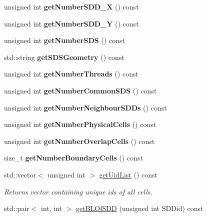\begin{DoxyCompactItemize}
unsigned int {\bfseries get\+Number\+S\+D\+D\+\_\+X} () const
\item 
\mbox{\label{classDomain_a8e8d6c959123597f6e2d8779a836d32c}} 
unsigned int {\bfseries get\+Number\+S\+D\+D\+\_\+Y} () const
\item 
\mbox{\label{classDomain_a25e60a79720035ab95a1eb4a41efb53c}} 
unsigned int {\bfseries get\+Number\+S\+DS} () const
\item 
\mbox{\label{classDomain_a388103cf2adcc7224f77d4c26a471d6a}} 
std\+::string {\bfseries get\+S\+D\+S\+Geometry} () const
\item 
\mbox{\label{classDomain_ac1e1ec57c7c0401dbee987d1c760ced7}} 
unsigned int {\bfseries get\+Number\+Threads} () const
\item 
\mbox{\label{classDomain_aed97d5cc3e6c7be237798b0903d2a6cf}} 
unsigned int {\bfseries get\+Number\+Common\+S\+DS} () const
\item 
\mbox{\label{classDomain_a985c94d1108a0a206f0201908d944a0d}} 
unsigned int {\bfseries get\+Number\+Neighbour\+S\+D\+Ds} () const
\item 
\mbox{\label{classDomain_a428011ce5e842c9f05545c57480ed30e}} 
unsigned int {\bfseries get\+Number\+Physical\+Cells} () const
\item 
\mbox{\label{classDomain_adbbd89acedd87b8b4814e367027551cd}} 
unsigned int {\bfseries get\+Number\+Overlap\+Cells} () const
\item 
\mbox{\label{classDomain_a8800b218283c35d315829dc9bac72c26}} 
size\+\_\+t {\bfseries get\+Number\+Boundary\+Cells} () const
\item 
std\+::vector$<$ unsigned int $>$ \mbox{\hyperlink{classDomain_a6f7d5f16ca53367feabc00b9efa05be8}{get\+Uid\+List}} () const
\begin{DoxyCompactList}\small\item\em Returns vector containing unique ids of all cells. \end{DoxyCompactList}\item 
std\+::pair$<$ int, int $>$ \mbox{\hyperlink{classDomain_a29e2005bed3aa17f036b8d2b36084153}{get\+B\+L\+Of\+S\+DD}} (unsigned int S\+D\+Did) const

\end{DoxyCompactItemize}
